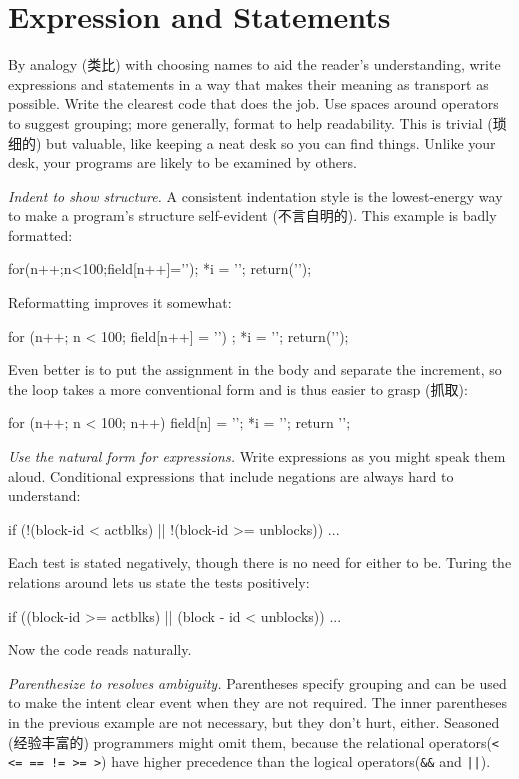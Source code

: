 \section{Expression and Statements}
\label{sec:exprstat}
By analogy (类比) with choosing names to aid the reader's understanding,
write expressions and statements in a way that makes their meaning as
transport as possible. Write the clearest code that does the job. Use
spaces around operators to suggest grouping; more generally, format to help
readability. This is trivial (琐细的) but valuable, like keeping a neat desk
so you can find things. Unlike your desk, your programs are likely to be
examined by others.

\emph{Indent to show structure.} A consistent indentation style is the
lowest-energy way to make a program's structure self-evident (不言自明的).
This example is badly formatted:
\begin{badcode}
    for(n++;n<100;field[n++]='\0');
    *i = '\0'; return('\n');
\end{badcode}
Reformatting improves it somewhat:
\begin{badcode}
    for (n++; n < 100; field[n++] = '\0')
        ;
    *i = '\0';
    return('\n');
\end{badcode}
Even better is to put the assignment in the body and separate the
increment, so the loop takes a more conventional form and is thus easier to
grasp (抓取):
\begin{wellcode}
    for (n++; n < 100; n++)
        field[n] = '\0';
    *i = '\0';
    return '\n';
\end{wellcode}
\emph{Use the natural form for expressions.} Write expressions as you might
speak them aloud. Conditional expressions that include negations are always
hard to understand:
\begin{badcode}
    if (!(block-id < actblks) || !(block-id >= unblocks))
        ...
\end{badcode}
Each test is stated negatively, though there is no need for either to be.
Turing the relations around lets us state the tests positively:
\begin{wellcode}
    if ((block-id >= actblks) || (block - id < unblocks))
        ...
\end{wellcode}
Now the code reads naturally.

\emph{Parenthesize to resolves ambiguity.} Parentheses specify grouping and
can be used to make the intent clear event when they are not required. The
inner parentheses in the previous example are not necessary, but they don't
hurt, either. Seasoned (经验丰富的) programmers might omit them, because the
relational operators(\verb"< <= == != >= >") have higher precedence than
the logical operators(\verb"&&" and \verb"||").

